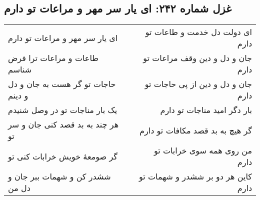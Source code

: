 \begin{center}
\section*{غزل شماره ۲۴۲: ای یار سر مهر و مراعات تو دارم}
\label{sec:242}
\begin{longtable}{l p{0.5cm} r}
ای یار سر مهر و مراعات تو دارم
&&
ای دولت دل خدمت و طاعات تو دارم
\\
طاعات و مراعات ترا فرض شناسم
&&
جان و دل و دین وقف مراعات تو دارم
\\
حاجات تو گر هست به جان و دل و دینم
&&
جان و دل و دین از پی حاجات تو دارم
\\
یک بار مناجات تو در وصل شنیدم
&&
بار دگر امید مناجات تو دارم
\\
هر چند به بد قصد کنی جان و سر تو
&&
گر هیچ به بد قصد مکافات تو دارم
\\
گر صومعهٔ خویش خرابات کنی تو
&&
من روی همه سوی خرابات تو دارم
\\
ششدر کن و شهمات ببر جان و دل من
&&
کاین هر دو بر ششدر و شهمات تو دارم
\\
\end{longtable}
\end{center}
